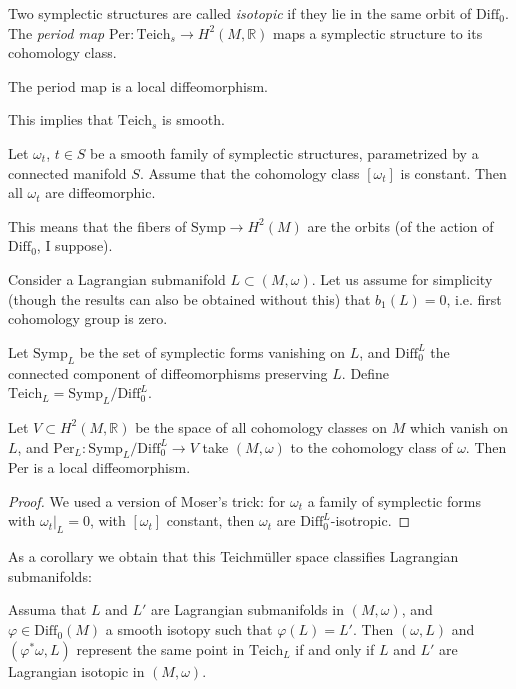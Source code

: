 Two symplectic structures are called {\it
isotopic} if they lie
in the same orbit of $\text{Diff}_0$.
The {\it period map}
$\text{Per}:\text{Teich}_s \to
H^{2}(M,\mathbb{R})$
maps a symplectic structure to its cohomology
class.

\begin{theorem}[Moser, 1965]
\label{theorem-period-map-is-local-diffeo}
The period map is a local diffeomorphism.
\end{theorem}

\noindent
This implies that $\text{Teich}_s$ is smooth.

\begin{theorem}
\label{theorem-mosers-trick}
Let $\omega_t$, $t \in S$ be a smooth family
of symplectic
structures, parametrized by a connected
manifold $S$.
Assume that the cohomology class
$[\omega_t]$ is constant.
Then all $\omega_t$ are diffeomorphic.
\end{theorem}

\noindent
This means that the fibers of $\text{Symp}\to
H^{2}(M)$
are the orbits (of the action of
$\text{Diff}_0$, I suppose).

\medskip\noindent
Consider a Lagrangian submanifold $L \subset
(M,\omega)$.
Let us assume for simplicity (though the
results
can also be obtained without this) that
$b_1(L)=0$,
i.e. first cohomology group is zero.

Let $\text{Symp}_L$ be the set of symplectic
forms vanishing on $L$,
and $\text{Diff}_0^L$ the connected component
of diffeomorphisms
preserving $L$.
Define
$\text{Teich}_L=\text{Symp}_L/\text{Diff}
_0^L$.

\begin{theorem}
\label{theorem-}
Let $V \subset H^{2}(M,\mathbb{R})$ be the
space of all
cohomology classes on $M$ which vanish on
$L$,
and $\text{Per}_L:
\text{Symp}_L/\text{Diff}^L_0 \to V$
take $(M,\omega)$ to the cohomology class of
$\omega$.
Then Per is a local diffeomorphism.
\end{theorem}

\begin{proof}
We used a version of Moser's trick: for
$\omega_t$ a family
of symplectic forms with $\omega_t|_{L}=0$,
with $[\omega_t]$ constant, then $\omega_t$
are $\text{Diff}_0^L$-isotropic.
\end{proof}

\noindent
As a corollary we obtain that this
Teichmüller space
classifies Lagrangian submanifolds:

\begin{lemma}
\label{lemma-techm-class-lagra-subma}
Assuma that $L$ and $L'$ are Lagrangian
submanifolds in $(M,\omega)$,
and $\varphi \in \text{Diff}_0(M)$ a smooth
isotopy such that
$\varphi(L)=L'$. Then $(\omega,L)$ and
$(\varphi^*\omega,L)$
represent the same point in $\text{Teich}_L$
if and only if
$L$ and $L'$ are Lagrangian isotopic in
$(M,\omega)$.
\end{lemma}

